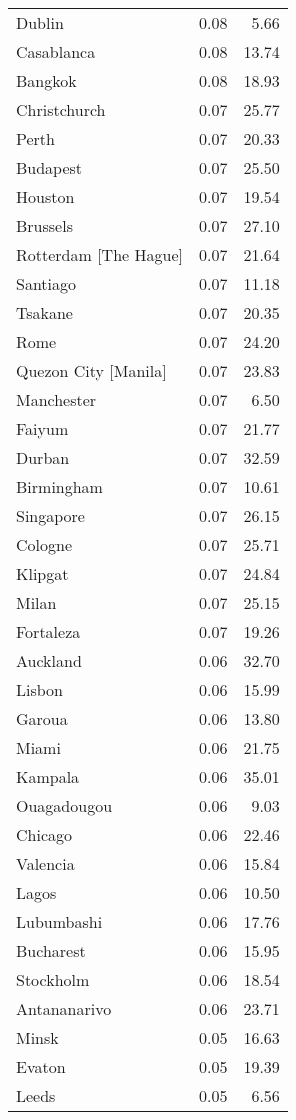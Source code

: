 \begin{longtable}{lrr}
  Dublin & 0.08 & 5.66 \\ 
  Casablanca & 0.08 & 13.74 \\ 
  Bangkok & 0.08 & 18.93 \\ 
  Christchurch & 0.07 & 25.77 \\ 
  Perth & 0.07 & 20.33 \\ 
  Budapest & 0.07 & 25.50 \\ 
  Houston & 0.07 & 19.54 \\ 
  Brussels & 0.07 & 27.10 \\ 
  Rotterdam [The Hague] & 0.07 & 21.64 \\ 
  Santiago & 0.07 & 11.18 \\ 
  Tsakane & 0.07 & 20.35 \\ 
  Rome & 0.07 & 24.20 \\ 
  Quezon City [Manila] & 0.07 & 23.83 \\ 
  Manchester & 0.07 & 6.50 \\ 
  Faiyum & 0.07 & 21.77 \\ 
  Durban & 0.07 & 32.59 \\ 
  Birmingham & 0.07 & 10.61 \\ 
  Singapore & 0.07 & 26.15 \\ 
  Cologne & 0.07 & 25.71 \\ 
  Klipgat & 0.07 & 24.84 \\ 
  Milan & 0.07 & 25.15 \\ 
  Fortaleza & 0.07 & 19.26 \\ 
  Auckland & 0.06 & 32.70 \\ 
  Lisbon & 0.06 & 15.99 \\ 
  Garoua & 0.06 & 13.80 \\ 
  Miami & 0.06 & 21.75 \\ 
  Kampala & 0.06 & 35.01 \\ 
  Ouagadougou & 0.06 & 9.03 \\ 
  Chicago & 0.06 & 22.46 \\ 
  Valencia & 0.06 & 15.84 \\ 
  Lagos & 0.06 & 10.50 \\ 
  Lubumbashi & 0.06 & 17.76 \\ 
  Bucharest & 0.06 & 15.95 \\ 
  Stockholm & 0.06 & 18.54 \\ 
  Antananarivo & 0.06 & 23.71 \\ 
  Minsk & 0.05 & 16.63 \\ 
  Evaton & 0.05 & 19.39 \\ 
  Leeds & 0.05 & 6.56 \\ 

\end{longtable}
